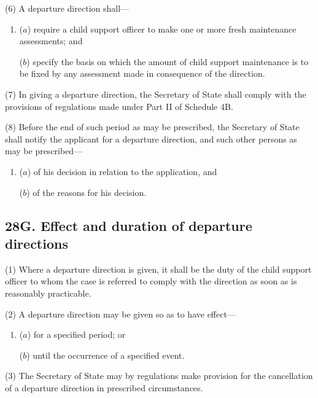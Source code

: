\documentclass[12pt,a4paper]{article}
\begin{document}
(6) A departure direction shall—
\begin{enumerate}\item[]
($a$) require 
a child support officer to make 
one or more fresh maintenance assessments; and

($b$) specify the basis on which the amount of child support maintenance is to be fixed by any assessment made in consequence of the direction.
\end{enumerate}

(7) In giving a departure direction, the Secretary of State shall comply with the provisions of regulations made under Part II of Schedule 4B.

(8) Before the end of such period as may be prescribed, the Secretary of State shall notify the applicant for a departure direction, and such other persons as may be prescribed—
\begin{enumerate}\item[]
($a$) of his decision in relation to the application, and

($b$) of the reasons for his decision.
\end{enumerate}


\subsection{28G. Effect and duration of departure directions}

(1) Where a departure direction is given, it shall be the duty of the child support officer to whom the case is referred to comply with the direction as soon as is reasonably practicable.

(2) A departure direction may be given so as to have effect—
\begin{enumerate}\item[]
($a$) for a specified period; or

($b$) until the occurrence of a specified event.
\end{enumerate}

(3) The Secretary of State may by regulations make provision for the cancellation of a departure direction in prescribed circumstances.
\end{document}
